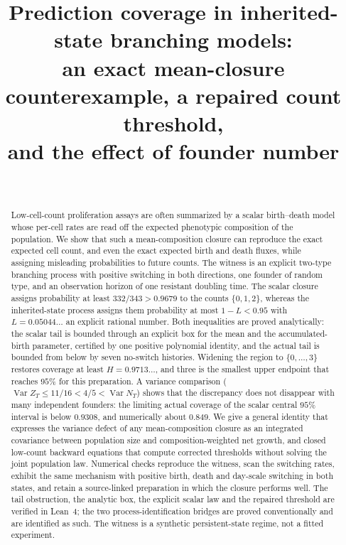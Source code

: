 \documentclass[11pt,a4paper]{article}
\title{Prediction coverage in inherited-state branching models:\\ an exact mean-closure counterexample, a repaired count threshold,\\ and the effect of founder number}
\author{\PaperAuthor\\[2pt] {\small\itshape \PaperAffiliation}}
\date{\PaperDate}
\theoremstyle{plain}
\theoremstyle{definition}
\theoremstyle{remark}
\newcommand{\Var}{\operatorname{Var}}
\begin{document}
\maketitle

\begin{abstract}
Low-cell-count proliferation assays are often summarized by a scalar birth--death model whose per-cell rates are read off the expected phenotypic composition of the population. We show that such a mean-composition closure can reproduce the exact expected cell count, and even the exact expected birth and death fluxes, while assigning misleading probabilities to future counts. The witness is an explicit two-type branching process with positive switching in both directions, one founder of random type, and an observation horizon of one resistant doubling time. The scalar closure assigns probability at least $332/343>0.9679$ to the counts $\{0,1,2\}$, whereas the inherited-state process assigns them probability at most $1-L<0.95$ with $L=0.05044\ldots$ an explicit rational number. Both inequalities are proved analytically: the scalar tail is bounded through an explicit box for the mean and the accumulated-birth parameter, certified by one positive polynomial identity, and the actual tail is bounded from below by seven no-switch histories. Widening the region to $\{0,\dots,3\}$ restores coverage at least $H=0.9713\ldots$, and three is the smallest upper endpoint that reaches $95\%$ for this preparation. A variance comparison ($\Var Z_T\le 11/16<4/5<\Var N_T$) shows that the discrepancy does not disappear with many independent founders: the limiting actual coverage of the scalar central $95\%$ interval is below $0.9308$, and numerically about $0.849$. We give a general identity that expresses the variance defect of any mean-composition closure as an integrated covariance between population size and composition-weighted net growth, and closed low-count backward equations that compute corrected thresholds without solving the joint population law. Numerical checks reproduce the witness, scan the switching rates, exhibit the same mechanism with positive birth, death and day-scale switching in both states, and retain a source-linked preparation in which the closure performs well. The tail obstruction, the analytic box, the explicit scalar law and the repaired threshold are verified in Lean~4; the two process-identification bridges are proved conventionally and are identified as such. The witness is a synthetic persistent-state regime, not a fitted experiment.
\end{abstract}
\end{document}
